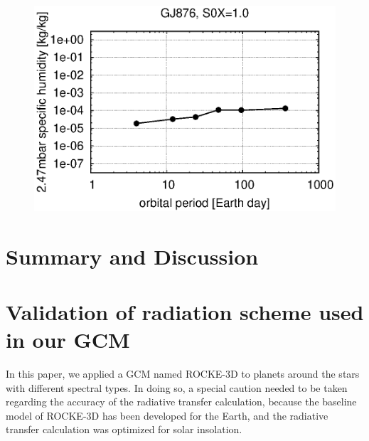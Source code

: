 \documentclass[11pt,numberedappendix,twocolappendix,]{emulateapj}
\begin{document}
\begin{figure}[!h]
    \begin{center}
    \includegraphics[width=\hsize]{fig/AqOH0TLS_GJ876_q_sensitivity_changeP.eps}
    \end{center}
\caption{}                                                                                                             
\label{fig:changeP}
\end{figure}



\section{Summary and Discussion}
\label{s:summary}

\acknowledgments




\appendix


\section{Validation of radiation scheme used in our GCM}
\label{ap:radiation}

In this paper, we applied a GCM named ROCKE-3D to planets around the stars with different spectral types. 
In doing so, a special caution needed to be taken regarding the accuracy of the radiative transfer calculation, because the baseline model of ROCKE-3D has been developed for the Earth, and the radiative transfer calculation was optimized for solar insolation. 
\end{document}
